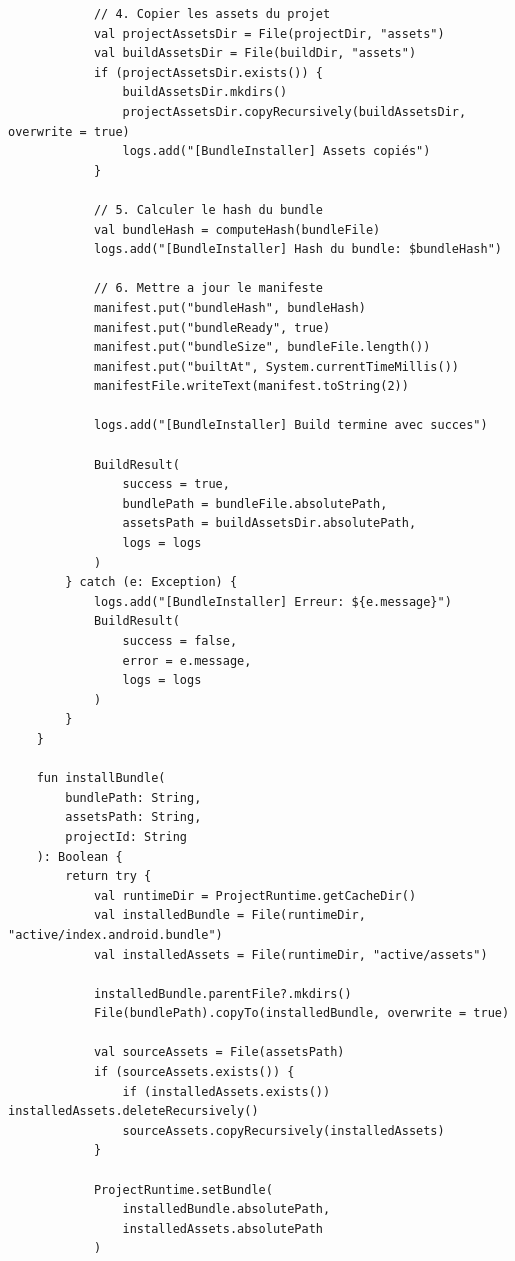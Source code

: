 \documentclass[11pt]{article}
\begin{document}
\begin{verbatim}
            // 4. Copier les assets du projet
            val projectAssetsDir = File(projectDir, "assets")
            val buildAssetsDir = File(buildDir, "assets")
            if (projectAssetsDir.exists()) {
                buildAssetsDir.mkdirs()
                projectAssetsDir.copyRecursively(buildAssetsDir, overwrite = true)
                logs.add("[BundleInstaller] Assets copiés")
            }

            // 5. Calculer le hash du bundle
            val bundleHash = computeHash(bundleFile)
            logs.add("[BundleInstaller] Hash du bundle: $bundleHash")

            // 6. Mettre a jour le manifeste
            manifest.put("bundleHash", bundleHash)
            manifest.put("bundleReady", true)
            manifest.put("bundleSize", bundleFile.length())
            manifest.put("builtAt", System.currentTimeMillis())
            manifestFile.writeText(manifest.toString(2))

            logs.add("[BundleInstaller] Build termine avec succes")

            BuildResult(
                success = true,
                bundlePath = bundleFile.absolutePath,
                assetsPath = buildAssetsDir.absolutePath,
                logs = logs
            )
        } catch (e: Exception) {
            logs.add("[BundleInstaller] Erreur: ${e.message}")
            BuildResult(
                success = false,
                error = e.message,
                logs = logs
            )
        }
    }

    fun installBundle(
        bundlePath: String,
        assetsPath: String,
        projectId: String
    ): Boolean {
        return try {
            val runtimeDir = ProjectRuntime.getCacheDir()
            val installedBundle = File(runtimeDir, "active/index.android.bundle")
            val installedAssets = File(runtimeDir, "active/assets")

            installedBundle.parentFile?.mkdirs()
            File(bundlePath).copyTo(installedBundle, overwrite = true)

            val sourceAssets = File(assetsPath)
            if (sourceAssets.exists()) {
                if (installedAssets.exists()) installedAssets.deleteRecursively()
                sourceAssets.copyRecursively(installedAssets)
            }

            ProjectRuntime.setBundle(
                installedBundle.absolutePath,
                installedAssets.absolutePath
            )


\end{verbatim}
\end{document}
